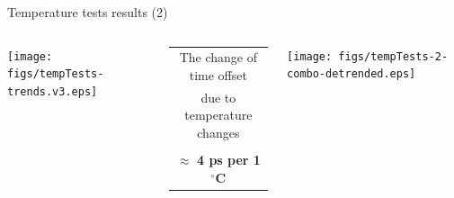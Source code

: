 \documentclass[compress,red]{beamer}
\begin{document}
\begin{frame}{Temperature tests results (2)}


  \begin{columns}[c]
		\hspace{-1.0cm}
		\begin{center}
		\texttt{[image: figs/tempTests-trends.v3.eps]}
		\end{center}

		\begin{center}
		  \begin{table}[!t] \footnotesize 
		  \begin{tabular}{ c  c }    
		  \multicolumn{2}{c}{ The change of time offset }       \\      
		  \multicolumn{2}{c}{ due to temperature changes}       \\    
		  \multicolumn{2}{c}{}       \\  
		  \multicolumn{2}{c}{ $\approx$ \textbf{4 ps per 1}$^{\circ}$\textbf{C}  }       \\  
		  \end{tabular}
		  \end{table}   		
		\end{center}

		\hspace{-0.8cm}
		\begin{center}
		\texttt{[image: figs/tempTests-2-combo-detrended.eps]}
		\end{center}



\end{columns}
\end{frame}
\end{document}
